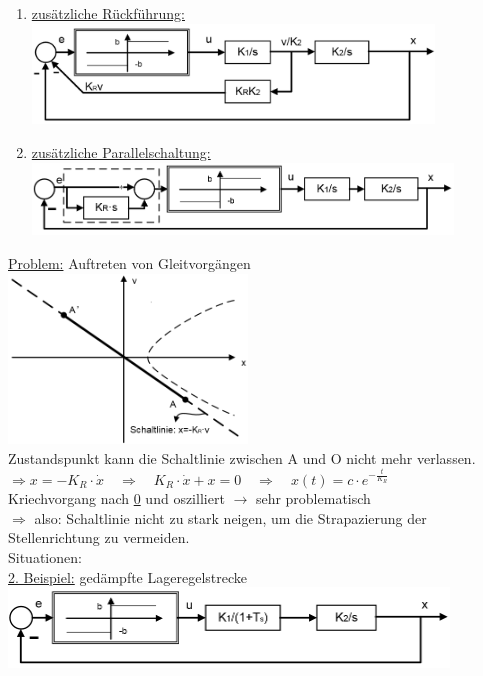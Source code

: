 \documentclass[openany,a4paper,11pt]{book}
\begin{document}
\begin{enumerate}
    \item \uline{zusätzliche Rückführung:}\\
    \includegraphics[width=4.2in]{imgs/NLR15.png}
    \item \uline{zusätzliche Parallelschaltung:}\\
    \includegraphics[width=4.4in]{imgs/NLR16.png}
\end{enumerate}
\uline{Problem:} Auftreten von Gleitvorgängen\\
\includegraphics[width=2.5in]{imgs/NLR17.png}\\
Zustandspunkt kann die Schaltlinie zwischen A und O nicht mehr verlassen.\\
$\Rightarrow x=-K_R\cdot \dot{x}\quad \Rightarrow \quad K_R\cdot \dot{x}+x=0\quad \Rightarrow \quad x(t)=c\cdot e^{-\frac{t}{K_R}}$\\
Kriechvorgang nach \uline{0} und oszilliert $\rightarrow$ sehr problematisch\\
$\Rightarrow$ also: Schaltlinie nicht zu stark neigen, um die Strapazierung der Stellenrichtung zu vermeiden.\\
Situationen: \\
\uline{2. Beispiel:} gedämpfte Lageregelstrecke\\
\includegraphics[width=4.6in]{imgs/NLR18.png}
\end{document}

